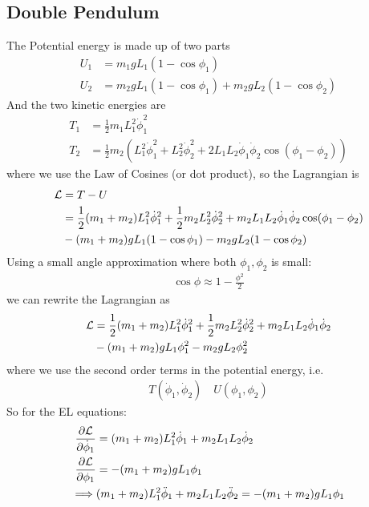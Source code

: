 \documentclass[../main.tex]{subfiles}
\begin{document}
\subsection*{Double Pendulum} 
The Potential energy is made up of two parts
\begin{align*}
    U_1 &= m_1 g L_1 (1 - \cos\phi_1) \\
    U_2 &= m_2 g L_1 (1 - \cos\phi_1) + m_2 g L_2 (1 - \cos \phi_2)
\end{align*}
And the two kinetic energies are
\begin{align*}
    T_1 &= \frac{1}{2} m_1 L_1^2 \dot \phi_1^2 \\
    T_2 &= \frac{1}{2} m_2 (L_1^2 \dot \phi_1^2 + L_2^2 \dot \phi_2^2 + 2 L_1 L_2 \dot \phi_1 \dot \phi_2 \cos(\phi_1 - \phi_2))
\end{align*}
where we use the Law of Cosines (or dot product), so the Lagrangian is
\begin{align*}
    \mathcal{L} &= T - U \\
    &= \frac{1}{2} (m_1 + m_2) L_1^2 \dot \phi_1^2 
        + \frac{1}{2} m_2 L_2^2 \dot \phi_2^2 
        + m_2 L_1 L_2 \dot \phi_1 \dot \phi_2 \cos(\phi_1 - \phi_2) \\
    &- (m_1 + m_2) g L_1 (1 - \cos\phi_1)  - m_2 g L_2 (1 - \cos \phi_2)
\end{align*}
Using a small angle approximation where both $\phi_1, \phi_2$ is small:
\begin{align*}
    \cos\phi \approx 1 - \frac{\phi^2}{2}
\end{align*} 
we can rewrite the Lagrangian as
\begin{align*}
    \mathcal{L} &= \frac{1}{2} (m_1 + m_2) L_1^2 \dot \phi_1^2 
        + \frac{1}{2} m_2 L_2^2 \dot \phi_2^2 
        + m_2 L_1 L_2 \dot \phi_1 \dot \phi_2 \\
    &- (m_1 + m_2) g L_1 \phi_1^2  - m_2 g L_2 \phi_2^2
\end{align*}
where we use the second order terms in the potential energy, i.e.
\begin{align*}
    T (\dot\phi_1, \dot\phi_2) \quad U(\phi_1, \phi_2)
\end{align*}
So for the EL equations:
\begin{align*}
    \pdv{\mathcal{L}}{\dot\phi_1} &= (m_1 + m_2) L_1^2 \dot\phi_1 + m_2 L_1 L_2 \dot\phi_2 \\
    \pdv{\mathcal{L}}{\phi_1} &= - (m_1 + m_2) g L_1 \phi_1 \\
    \implies &(m_1 + m_2) L_1^2 \ddot\phi_1 + m_2 L_1 L_2 \ddot\phi_2 = - (m_1 + m_2) g L_1 \phi_1
\end{align*}
\end{document}
